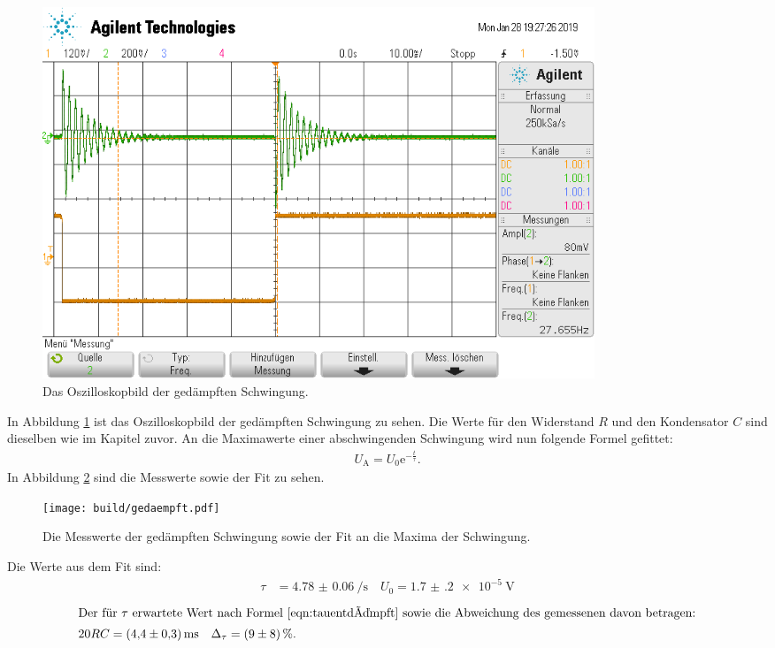 \begin{figure}
  \centering
  \includegraphics[width=0.8\textwidth]{Schlager/scope_26.png}
  \caption{Das Oszilloskopbild der gedämpften Schwingung.}
  \label{fig:gedaempft}
\end{figure}
In Abbildung \ref{fig:gedaempft} ist das Oszilloskopbild der gedämpften Schwingung zu sehen.
Die Werte für den Widerstand $R$ und den Kondensator $C$ sind dieselben wie im Kapitel zuvor.
An die Maximawerte einer abschwingenden Schwingung wird nun folgende Formel gefittet:
\begin{align}
  U_\text{A} = U_0 \text{e}^{- \frac{t}{\tau}}.
\end{align}
In Abbildung \ref{fig:gedaempft_fit} sind die Messwerte sowie der Fit zu sehen.
\begin{figure}
  \centering
  \texttt{[image: build/gedaempft.pdf]}
  \caption{Die Messwerte der gedämpften Schwingung sowie der Fit an die Maxima der Schwingung.}
  \label{fig:gedaempft_fit}
\end{figure}
Die Werte aus dem Fit sind:
\begin{align*}
  \tau &= \SI{4.78(6)}{\per\second} \quad U_0 = \SI{1.7(2)e-5}{\volt}
\end{align*}
\begin{align*}
  \intertext{Der für $\tau$ erwartete Wert nach Formel \eqref{eqn:tauentdämpft} sowie die Abweichung des gemessenen davon betragen:}
  20 R C &= \SI{4.4(3)}{\milli\second} \quad \Delta_{\tau} = \SI{9(8)}{\percent}.
\end{align*}





